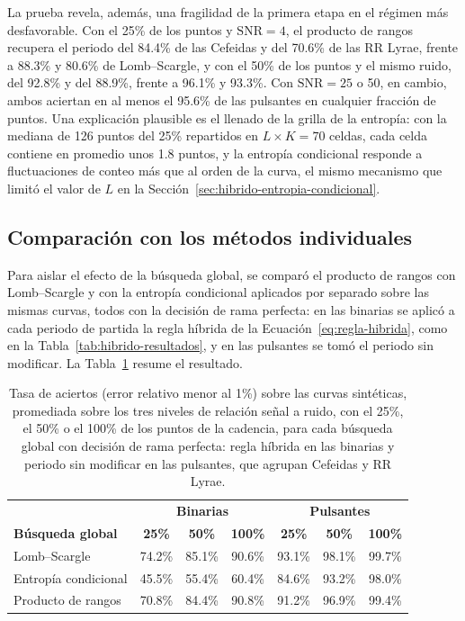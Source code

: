 \documentclass[12pt,letterpaper,oneside]{book}
\begin{document}
La prueba revela, adem\'as, una fragilidad de la primera etapa en el r\'egimen m\'as desfavorable. Con el 25\% de los puntos y $\mathrm{SNR}=4$, el producto de rangos recupera el periodo del 84.4\% de las Cefeidas y del 70.6\% de las RR Lyrae, frente a 88.3\% y 80.6\% de Lomb--Scargle, y con el 50\% de los puntos y el mismo ruido, del 92.8\% y del 88.9\%, frente a 96.1\% y 93.3\%. Con $\mathrm{SNR}=25$ o 50, en cambio, ambos aciertan en al menos el 95.6\% de las pulsantes en cualquier fracci\'on de puntos. Una explicaci\'on plausible es el llenado de la grilla de la entrop\'ia: con la mediana de 126 puntos del 25\% repartidos en $L\times K=70$ celdas, cada celda contiene en promedio unos 1.8 puntos, y la entrop\'ia condicional responde a fluctuaciones de conteo m\'as que al orden de la curva, el mismo mecanismo que limit\'o el valor de $L$ en la Secci\'on~\ref{sec:hibrido-entropia-condicional}.

\subsection{Comparaci\'on con los m\'etodos individuales}

Para aislar el efecto de la b\'usqueda global, se compar\'o el producto de rangos con Lomb--Scargle y con la entrop\'ia condicional aplicados por separado sobre las mismas curvas, todos con la decisi\'on de rama perfecta: en las binarias se aplic\'o a cada periodo de partida la regla h\'ibrida de la Ecuaci\'on~\eqref{eq:regla-hibrida}, como en la Tabla~\ref{tab:hibrido-resultados}, y en las pulsantes se tom\'o el periodo sin modificar. La Tabla~\ref{tab:validacion-individuales} resume el resultado.

\begin{table}[H]
	\centering
	\small
	\begin{tabular}{lcccccc}
		\hline
		& \multicolumn{3}{c}{\textbf{Binarias}} & \multicolumn{3}{c}{\textbf{Pulsantes}} \\
		\textbf{B\'usqueda global} & \textbf{25\%} & \textbf{50\%} & \textbf{100\%} & \textbf{25\%} & \textbf{50\%} & \textbf{100\%} \\
		\hline
		Lomb--Scargle & 74.2\% & 85.1\% & 90.6\% & 93.1\% & 98.1\% & 99.7\% \\
		Entrop\'ia condicional & 45.5\% & 55.4\% & 60.4\% & 84.6\% & 93.2\% & 98.0\% \\
		Producto de rangos & 70.8\% & 84.4\% & 90.8\% & 91.2\% & 96.9\% & 99.4\% \\
		\hline
	\end{tabular}
	\caption[Comparaci\'on con los m\'etodos individuales sobre curvas sint\'eticas]{Tasa de aciertos (error relativo menor al 1\%) sobre las curvas sint\'eticas, promediada sobre los tres niveles de relaci\'on se\~nal a ruido, con el 25\%, el 50\% o el 100\% de los puntos de la cadencia, para cada b\'usqueda global con decisi\'on de rama perfecta: regla h\'ibrida en las binarias y periodo sin modificar en las pulsantes, que agrupan Cefeidas y RR Lyrae.}
	\label{tab:validacion-individuales}
\end{table}
\end{document}
